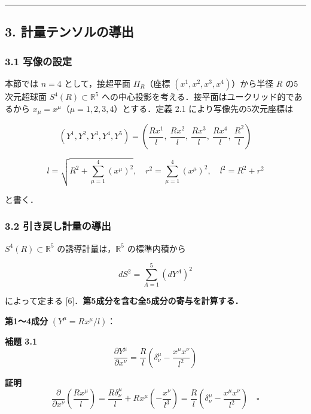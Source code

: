 \documentclass[a4paper,11pt]{ltjsarticle}
\theoremstyle{definition}
\begin{document}
\begin{center}\rule{0.5\linewidth}{0.5pt}\end{center}

\subsection{3. 計量テンソルの導出}\label{ux8a08ux91cfux30c6ux30f3ux30bdux30ebux306eux5c0eux51fa}

\subsubsection{3.1 写像の設定}\label{ux5199ux50cfux306eux8a2dux5b9a}

本節では \(n=4\) として，接超平面 \(\Pi_R\)（座標 \((x^1, x^2, x^3, x^4)\)）から半径 \(R\) の5次元超球面 \(S^4(R) \subset \mathbb{R}^5\) への中心投影を考える．接平面はユークリッド的であるから \(x_\mu = x^\mu\)（\(\mu = 1,2,3,4\)）とする．定義 2.1 により写像先の5次元座標は

\[(Y^1, Y^2, Y^3, Y^4, Y^5) = \left(\frac{Rx^1}{l},\ \frac{Rx^2}{l},\ \frac{Rx^3}{l},\ \frac{Rx^4}{l},\ \frac{R^2}{l}\right) \tag{3.1}\]

\[l = \sqrt{R^2 + \sum_{\mu=1}^4 (x^\mu)^2},\quad r^2 = \sum_{\mu=1}^4(x^\mu)^2,\quad l^2 = R^2 + r^2 \tag{3.2}\]

と書く．

\subsubsection{3.2 引き戻し計量の導出}\label{ux5f15ux304dux623bux3057ux8a08ux91cfux306eux5c0eux51fa}

\(S^4(R) \subset \mathbb{R}^5\) の誘導計量は，\(\mathbb{R}^5\) の標準内積から

\[dS^2 = \sum_{A=1}^{5} (dY^A)^2 \tag{3.3}\]

によって定まる {[}6{]}．\textbf{第5成分を含む全5成分の寄与を計算する．}

\textbf{第1〜4成分} \((Y^\mu = R x^\mu / l)\)：

\textbf{補題 3.1}\\
\[\frac{\partial Y^\mu}{\partial x^\nu} = \frac{R}{l}\left(\delta^\mu_\nu - \frac{x^\mu x^\nu}{l^2}\right) \tag{3.4}\]

\textbf{証明}\\
\[\frac{\partial}{\partial x^\nu}\!\left(\frac{Rx^\mu}{l}\right) = \frac{R\delta^\mu_\nu}{l} + Rx^\mu\!\left(-\frac{x^\nu}{l^3}\right) = \frac{R}{l}\!\left(\delta^\mu_\nu - \frac{x^\mu x^\nu}{l^2}\right) \quad \square\]
\end{document}
